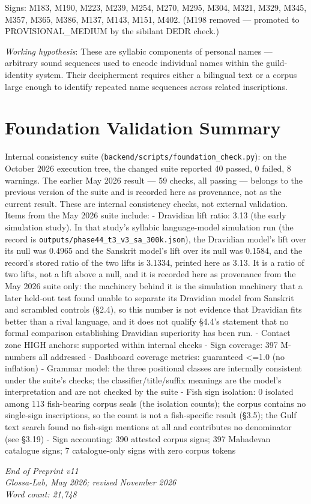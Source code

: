\documentclass[11pt]{article}
\begin{document}
Signs: M183, M190, M223, M239, M254, M270, M295, M304, M321, M329,
M345, M357, M365, M386, M137, M143, M151, M402. (M198 removed --- promoted to PROVISIONAL\_MEDIUM by the sibilant DEDR check.)

\emph{Working hypothesis}: These are syllabic components of personal
names --- arbitrary sound sequences used to encode individual names
within the guild-identity system. Their decipherment requires either a
bilingual text or a corpus large enough to identify repeated name
sequences across related inscriptions.

\section{Foundation Validation
Summary}\label{appendix-c-foundation-validation-summary}

Internal consistency suite (\texttt{backend/scripts/foundation\_check.py}): on the October 2026 execution tree, the changed suite reported 40 passed, 0 failed, 8 warnings. The earlier May 2026 result --- 59 checks, all passing --- belongs to the previous version of the suite and is recorded here as provenance, not as the current result. These are internal consistency checks, not external validation. Items from the May 2026 suite include: -
Dravidian lift ratio: 3.13 (the early simulation study). In that study's syllabic language-model simulation run (the record is \texttt{outputs/phase44\_t3\_v3\_sa\_300k.json}), the Dravidian model's lift over its null was 0.4965 and the Sanskrit model's lift over its null was 0.1584, and the record's stored ratio of the two lifts is 3.1334, printed here as 3.13. It is a ratio of two lifts, not a lift above a null, and it is recorded here as provenance from the May 2026 suite only: the machinery behind it is the simulation machinery that a later held-out test found unable to separate its Dravidian model from Sanskrit and scrambled controls (§2.4), so this number is not evidence that Dravidian fits better than a rival language, and it does not qualify §4.4's statement that no formal comparison establishing Dravidian superiority has been run. - Contact zone
HIGH anchors: supported within internal checks - Sign coverage: 397 M-numbers all
addressed - Dashboard coverage metrics: guaranteed \textless{}=1.0 (no inflation) -
Grammar model: the three positional classes are internally consistent under the suite's checks; the classifier/title/suffix meanings are the model's interpretation and are not checked by the suite - Fish sign isolation: 0 isolated among 113 fish-bearing corpus seals (the isolation counts); the corpus contains no single-sign inscriptions, so the count is not a fish-specific result (§3.5); the Gulf text search found no fish-sign mentions at all and contributes no denominator (see §3.19)
- Sign accounting: 390 attested corpus signs; 397 Mahadevan catalogue signs; 7 catalogue-only signs with zero corpus tokens

\emph{End of Preprint v11}\\
\emph{Glossa-Lab, May 2026; revised November 2026}\\
\emph{Word count: 21,748}
\end{document}
